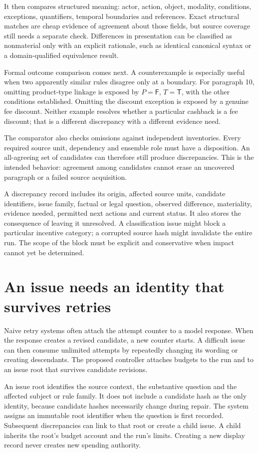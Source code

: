 \documentclass[12pt,a4paper,oneside,openany]{book}
\newcommand{\True}{\mathsf{T}}
\newcommand{\False}{\mathsf{F}}
\begin{document}
It then compares structured meaning: actor, action, object, modality, conditions,
exceptions, quantifiers, temporal boundaries and references. Exact structural
matches are cheap evidence of agreement about those fields, but source coverage
still needs a separate check. Differences in presentation can be classified as
nonmaterial only with an explicit rationale, such as identical canonical syntax
or a domain-qualified equivalence result.

Formal outcome comparison comes next. A counterexample is especially useful when
two apparently similar rules disagree only at a boundary. For paragraph 10,
omitting product-type linkage is exposed by $P=\False$, $T=\True$, with the other
conditions established. Omitting the discount exception is exposed by a genuine
fee discount. Neither example resolves whether a particular cashback is a fee
discount; that is a different discrepancy with a different evidence need.

The comparator also checks omissions against independent inventories. Every
required source unit, dependency and ensemble role must have a disposition. An
all-agreeing set of candidates can therefore still produce discrepancies. This
is the intended behavior: agreement among candidates cannot erase an uncovered
paragraph or a failed source acquisition.

A discrepancy record includes its origin, affected source units, candidate
identifiers, issue family, factual or legal question, observed difference,
materiality, evidence needed, permitted next actions and current status. It also
stores the consequence of leaving it unresolved. A classification issue might
block a particular incentive category; a corrupted source hash might invalidate
the entire run. The scope of the block must be explicit and conservative when
impact cannot yet be determined.

\section{An issue needs an identity that survives retries}

Naive retry systems often attach the attempt counter to a model response. When
the response creates a revised candidate, a new counter starts. A difficult issue
can then consume unlimited attempts by repeatedly changing its wording or
creating descendants. The proposed controller attaches budgets to the run and to
an issue root that survives candidate revisions.

An issue root identifies the source context, the substantive question and the
affected subject or rule family. It does not include a candidate hash as the only
identity, because candidate hashes necessarily change during repair. The system
assigns an immutable root identifier when the question is first recorded.
Subsequent discrepancies can link to that root or create a child issue. A child
inherits the root's budget account and the run's limits. Creating a new display
record never creates new spending authority.
\end{document}
